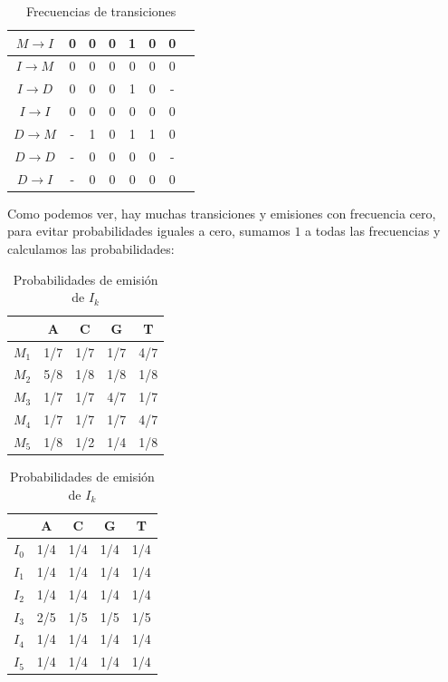 \begin{exampleth}
\begin{table}[H]
\begin{tabular}{|c|C|C|C|C|C|C|C|}
        $M\rightarrow I$ & 0 & 0 & 0 & 1 & 0 & 0 \\
        \hline
        $I\rightarrow M$ & 0 & 0 & 0 & 0 & 0 & 0 \\
        $I\rightarrow D$ & 0 & 0 & 0 & 1 & 0 & - \\
        $I\rightarrow I$ & 0 & 0 & 0 & 0 & 0 & 0 \\
        \hline
        $D\rightarrow M$ & - & 1 & 0 & 1 & 1 & 0 \\
        $D\rightarrow D$ & - & 0 & 0 & 0 & 0 & - \\
        $D\rightarrow I$ & - & 0 & 0 & 0 & 0 & 0 \\
        \hline
    \end{tabular}
    \caption{Frecuencias de transiciones}
\end{table}
Como podemos ver, hay muchas transiciones y emisiones con frecuencia cero, para evitar probabilidades iguales a cero, sumamos $1$ a todas las frecuencias y calculamos las probabilidades:
\begin{table}[H]
    \begin{minipage}{.5\linewidth}
        \centering
        \begin{tabular}{|c | C | C | C | C|}
            \hline
            & A & C & G & T \\
            \hline
            $M_1$ & 1/7 & 1/7 & 1/7 & 4/7 \\
            \hline
            $M_2$ & 5/8 & 1/8 & 1/8 & 1/8 \\
            \hline
            $M_3$ & 1/7 & 1/7 & 4/7 & 1/7 \\ 
            \hline
            $M_4$ & 1/7 & 1/7 & 1/7 & 4/7 \\
            \hline
            $M_5$ & 1/8 & 1/2 & 1/4 & 1/8 \\
            \hline
        \end{tabular}
        \caption{Probabilidades de emisión de $M_k$}
    \end{minipage}%
    \begin{minipage}{.5\linewidth}
        \centering
        \begin{tabular}{|c | C | C | C | C|}
            \hline
            & A & C & G & T \\
            \hline
            $I_0$ & 1/4 & 1/4 & 1/4 & 1/4 \\
            \hline
            $I_1$ & 1/4 & 1/4 & 1/4 & 1/4 \\
            \hline
            $I_2$ & 1/4 & 1/4 & 1/4 & 1/4 \\
            \hline
            $I_3$ & 2/5 & 1/5 & 1/5 & 1/5 \\ 
            \hline
            $I_4$ & 1/4 & 1/4 & 1/4 & 1/4 \\
            \hline
            $I_5$ & 1/4 & 1/4 & 1/4 & 1/4 \\
            \hline
        \end{tabular}
        \caption{Probabilidades de emisión de $I_k$}
    \end{minipage}
\end{table}


\end{exampleth}
